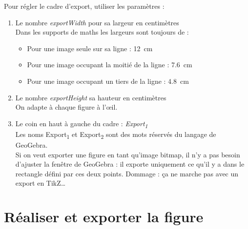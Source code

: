 \documentclass[10pt,a4paper]{report}
\begin{document}
Pour régler le cadre d'export, utiliser les paramètres :
\begin{enumerate}
	\item Le nombre \emph{exportWidth} pour sa largeur en centimètres \\
		Dans les supports de maths les largeurs sont toujours de :
		\begin{itemize}
			\item Pour une image seule sur sa ligne : \SI{12}{cm}
			\item Pour une image occupant la moitié de la ligne : \SI{7.6}{cm}
			\item Pour une image occupant un tiers de la ligne : \SI{4.8}{cm}
		\end{itemize}
	\item Le nombre \emph{exportHeight} sa hauteur en centimètres \\
		On adapte à chaque figure à l'œil.		
	\item Le coin en haut à gauche du cadre : \emph{Export\textsubscript{1}} \\
		\attention Les noms Export\textsubscript{1} et Export\textsubscript{2} sont des mots réservés du langage de GeoGebra. \\
		Si on veut exporter une figure en tant qu'image bitmap, il n'y a pas besoin d'ajuster la fenêtre de GeoGebra : il exporte uniquement ce qu'il y a dans le rectangle défini par ces deux points. Dommage : ça ne marche pas avec un export en TikZ\dots
\end{enumerate}





\newpage





\section{Réaliser et exporter la figure}
\end{document}
